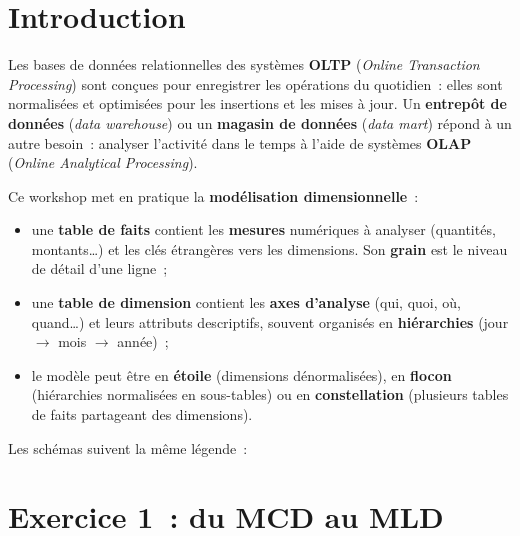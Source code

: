 \newpage
\section*{Introduction}

\noindent Les bases de données relationnelles des systèmes \textbf{OLTP} (\textit{Online Transaction Processing}) sont conçues pour enregistrer les opérations du quotidien~: elles sont normalisées et optimisées pour les insertions et les mises à jour. Un \textbf{entrepôt de données} (\textit{data warehouse}) ou un \textbf{magasin de données} (\textit{data mart}) répond à un autre besoin~: analyser l'activité dans le temps à l'aide de systèmes \textbf{OLAP} (\textit{Online Analytical Processing}).

Ce workshop met en pratique la \textbf{modélisation dimensionnelle}~:
\begin{itemize}
	\item une \textbf{table de faits} contient les \textbf{mesures} numériques à analyser (quantités, montants\dots) et les clés étrangères vers les dimensions. Son \textbf{grain} est le niveau de détail d'une ligne~;
	\item une \textbf{table de dimension} contient les \textbf{axes d'analyse} (qui, quoi, où, quand\dots) et leurs attributs descriptifs, souvent organisés en \textbf{hiérarchies} (jour $\rightarrow$ mois $\rightarrow$ année)~;
	\item le modèle peut être en \textbf{étoile} (dimensions dénormalisées), en \textbf{flocon} (hiérarchies normalisées en sous-tables) ou en \textbf{constellation} (plusieurs tables de faits partageant des dimensions).
\end{itemize}

\noindent Les schémas suivent la même légende~:
\legende

\newpage
\section*{Exercice 1~: du MCD au MLD}

